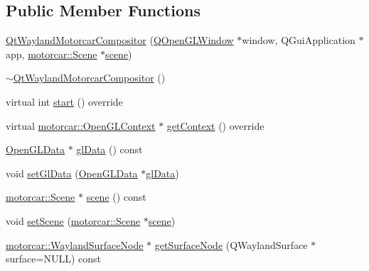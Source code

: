 \subsection*{Public Member Functions}
\begin{DoxyCompactItemize}
\item 
\hyperlink{classqtmotorcar_1_1QtWaylandMotorcarCompositor_a0de2ac0cbe6d725a501375a84573c470}{Qt\-Wayland\-Motorcar\-Compositor} (\hyperlink{classQOpenGLWindow}{Q\-Open\-G\-L\-Window} $\ast$window, Q\-Gui\-Application $\ast$app, \hyperlink{classmotorcar_1_1Scene}{motorcar\-::\-Scene} $\ast$\hyperlink{classqtmotorcar_1_1QtWaylandMotorcarCompositor_a8bb6c8e6a7acad99b814b192534f3ee2}{scene})
\item 
\hyperlink{classqtmotorcar_1_1QtWaylandMotorcarCompositor_a8d0178c57bdbe03ef7e4db6e13900950}{$\sim$\-Qt\-Wayland\-Motorcar\-Compositor} ()
\item 
virtual int \hyperlink{classqtmotorcar_1_1QtWaylandMotorcarCompositor_a34cd3f4acc535584eb066d3fe32ed9bf}{start} () override
\item 
virtual \hyperlink{classmotorcar_1_1OpenGLContext}{motorcar\-::\-Open\-G\-L\-Context} $\ast$ \hyperlink{classqtmotorcar_1_1QtWaylandMotorcarCompositor_a1fb6e9d59011be2912bc9cf51496b191}{get\-Context} () override
\item 
\hyperlink{classOpenGLData}{Open\-G\-L\-Data} $\ast$ \hyperlink{classqtmotorcar_1_1QtWaylandMotorcarCompositor_a50bc0b510d20d0298b9e164804543f81}{gl\-Data} () const 
\item 
void \hyperlink{classqtmotorcar_1_1QtWaylandMotorcarCompositor_a0122a32ec769e7190b3a2e0a838f0053}{set\-Gl\-Data} (\hyperlink{classOpenGLData}{Open\-G\-L\-Data} $\ast$\hyperlink{classqtmotorcar_1_1QtWaylandMotorcarCompositor_a50bc0b510d20d0298b9e164804543f81}{gl\-Data})
\item 
\hyperlink{classmotorcar_1_1Scene}{motorcar\-::\-Scene} $\ast$ \hyperlink{classqtmotorcar_1_1QtWaylandMotorcarCompositor_a8bb6c8e6a7acad99b814b192534f3ee2}{scene} () const 
\item 
void \hyperlink{classqtmotorcar_1_1QtWaylandMotorcarCompositor_a2a896748e415515de155c22ef70adeb0}{set\-Scene} (\hyperlink{classmotorcar_1_1Scene}{motorcar\-::\-Scene} $\ast$\hyperlink{classqtmotorcar_1_1QtWaylandMotorcarCompositor_a8bb6c8e6a7acad99b814b192534f3ee2}{scene})
\item 
\hyperlink{classmotorcar_1_1WaylandSurfaceNode}{motorcar\-::\-Wayland\-Surface\-Node} $\ast$ \hyperlink{classqtmotorcar_1_1QtWaylandMotorcarCompositor_a29fad56194eb849e901be554a09a6769}{get\-Surface\-Node} (Q\-Wayland\-Surface $\ast$surface=N\-U\-L\-L) const 
\end{DoxyCompactItemize}
